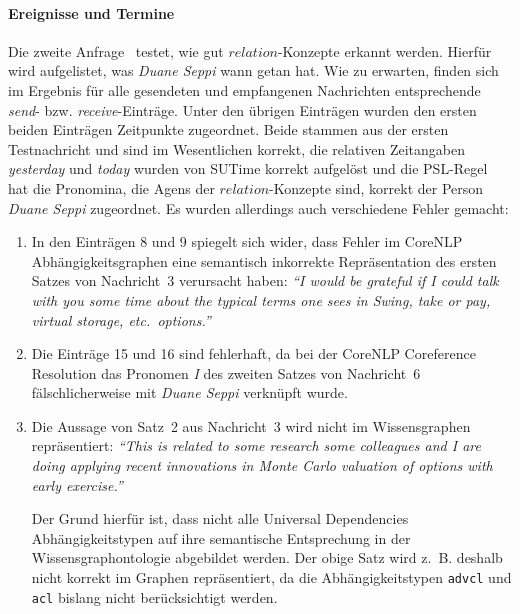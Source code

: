 \paragraph{Ereignisse und Termine}
Die zweite Anfrage~ testet, wie gut $relation$-Konzepte erkannt werden.
Hierfür wird aufgelistet, was \textit{Duane Seppi} wann getan hat.
Wie zu erwarten, finden sich im Ergebnis für alle gesendeten und empfangenen Nachrichten entsprechende \textit{send}- bzw. \textit{receive}-Einträge.
Unter den übrigen Einträgen wurden den ersten beiden Einträgen Zeitpunkte zugeordnet.
Beide stammen aus der ersten Testnachricht und sind im Wesentlichen korrekt, die relativen Zeitangaben \textit{yesterday} und \textit{today} wurden von SUTime korrekt aufgelöst und die PSL-Regel  hat die Pronomina, die Agens der $relation$-Konzepte sind, korrekt der Person \textit{Duane Seppi} zugeordnet.
Es wurden allerdings auch verschiedene Fehler gemacht:
\begin{enumerate}
	\item In den Einträgen 8 und 9 spiegelt sich wider, dass Fehler im CoreNLP Abhängigkeitsgraphen eine semantisch inkorrekte Repräsentation des ersten Satzes von Nachricht~3 verursacht haben:
	 	\textit{``I would be grateful if I could talk with you some time about the typical terms one sees in Swing, take or pay, virtual storage, etc.\ options.''} \errorA\
	\item Die Einträge 15 und 16 sind fehlerhaft, da bei der CoreNLP Coreference Resolution das Pronomen \textit{I} des zweiten Satzes von Nachricht~6 fälschlicherweise mit \textit{Duane Seppi} verknüpft wurde. \errorA\
	\item Die Aussage von Satz~2 aus Nachricht~3 wird nicht im Wissensgraphen repräsentiert:
		\textit{``This is related to some research some colleagues and I are doing applying recent innovations in Monte Carlo valuation of options with early exercise.''} \errorB\

		Der Grund hierfür ist, dass nicht alle Universal Dependencies Abhängigkeits\-typen auf ihre semantische Entsprechung in der Wissensgraphontologie abgebildet werden.
		Der obige Satz wird z.~B. deshalb nicht korrekt im Graphen repräsentiert, da die Abhängigkeitstypen \texttt{advcl} und \texttt{acl} bislang nicht berücksichtigt werden.
\end{enumerate}

